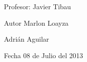 \par
 Profesor\-: Javier Tibau \par
 

 \begin{DoxyAuthor}{Autor}
Marlon Loayza 

Adrián Aguilar 
\end{DoxyAuthor}
\begin{DoxyDate}{Fecha}
08 de Julio del 2013 
\end{DoxyDate}
